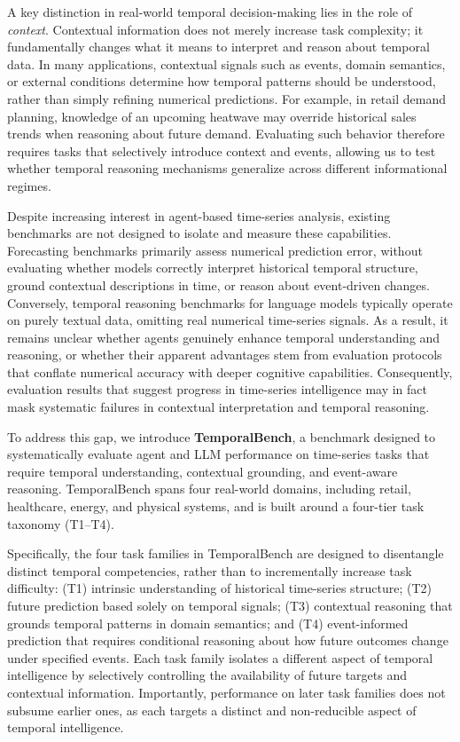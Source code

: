 A key distinction in real-world temporal decision-making lies in the role of \emph{context}.
Contextual information does not merely increase task complexity; it fundamentally changes what it means to interpret and reason about temporal data.
In many applications, contextual signals such as events, domain semantics, or external conditions determine how temporal patterns should be understood, rather than simply refining numerical predictions\cite{williams2024context, wang2024news}.
For example, in retail demand planning, knowledge of an upcoming heatwave may override historical sales trends when reasoning about future demand.
Evaluating such behavior therefore requires tasks that selectively introduce context and events, allowing us to test whether temporal reasoning mechanisms generalize across different informational regimes.

Despite increasing interest in agent-based time-series analysis, existing benchmarks are not designed to isolate and measure these capabilities. Forecasting benchmarks primarily assess numerical prediction error, without evaluating whether models correctly interpret historical temporal structure, ground contextual descriptions in time, or reason about event-driven changes\cite{qiu2024tfb,aksu2024gifteval}. Conversely, temporal reasoning benchmarks for language models typically operate on purely textual data, omitting real numerical time-series signals\cite{ning2020torque,fatemi2024test,wang2024tram}. As a result, it remains unclear whether agents genuinely enhance temporal understanding and reasoning, or whether their apparent advantages stem from evaluation protocols that conflate numerical accuracy with deeper cognitive capabilities. Consequently, evaluation results that suggest progress in time-series intelligence may in fact mask systematic failures in contextual interpretation and temporal reasoning.

To address this gap, we introduce \textbf{TemporalBench}, a benchmark designed to systematically evaluate agent and LLM performance on time-series tasks that require temporal understanding, contextual grounding, and event-aware reasoning. TemporalBench spans four real-world domains, including retail, healthcare, energy, and physical systems, and is built around a four-tier task taxonomy (T1–T4).

Specifically, the four task families in TemporalBench are designed to disentangle distinct temporal competencies, rather than to incrementally increase task difficulty:
(T1) intrinsic understanding of historical time-series structure;
(T2) future prediction based solely on temporal signals;
(T3) contextual reasoning that grounds temporal patterns in domain semantics;
and (T4) event-informed prediction that requires conditional reasoning about how future outcomes change under specified events.
Each task family isolates a different aspect of temporal intelligence by selectively controlling the availability of future targets and contextual information. Importantly, performance on later task families does not subsume earlier ones, as each targets a distinct and non-reducible aspect of temporal intelligence.


